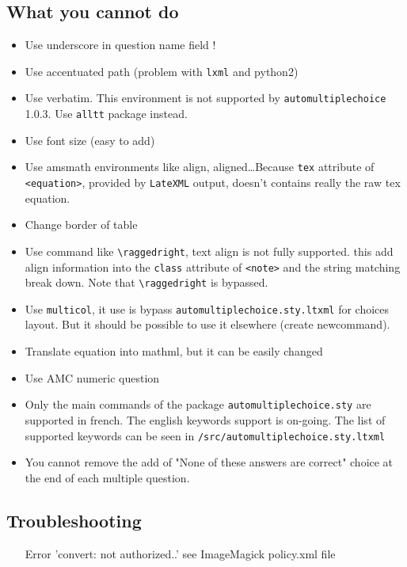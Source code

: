 \documentclass[a4paper]{article}
\newcommand{\elem}[1]{\texttt{<#1>}}
\begin{document}
\subsection{What you cannot do}\label{sec:cannot}
\begin{itemize}
\item Use underscore in question name field !
\item Use accentuated path (problem with \texttt{lxml} and python2)
\item Use verbatim. This environment is not supported by \texttt{automultiplechoice} 1.0.3. Use \texttt{alltt} package instead.
\item Use font size (easy to add)
\item Use amsmath environments like align, aligned\dots Because  \texttt{tex} attribute of \elem{equation}, provided by \texttt{LateXML} output, doesn't contains really the raw tex equation.
\item Change border of table
\item Use command like \texttt{\textbackslash raggedright}, text align is not fully supported. this add align information into the \texttt{class} attribute of \elem{note} and the string matching break down. Note that \texttt{\textbackslash raggedright} is bypassed. %
\item Use \texttt{multicol}, it use is bypass \texttt{automultiplechoice.sty.ltxml} for choices layout. But it should be possible to use it elsewhere (create newcommand).
\item Translate equation into mathml, but it can be easily changed
\item Use AMC numeric question
\item Only the main commands of the package \texttt{automultiplechoice.sty} are supported in french. The english keywords support is on-going. The list of supported keywords can be seen in \texttt{/src/automultiplechoice.sty.ltxml}
\item You cannot remove the add of "None of these answers are correct" choice at the end of each multiple question.


\end{itemize}


\subsection{Troubleshooting}
\begin{itemize}
\item[Error] 'convert: not authorized..' see ImageMagick policy.xml file
\end{itemize}
 
\end{document}
